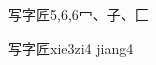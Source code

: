 \begin{entry}{写字匠}{5,6,6}{⼍、⼦、⼕}
  \begin{phonetics}{写字匠}{xie3zi4 jiang4}
  \end{phonetics}
\end{entry}
